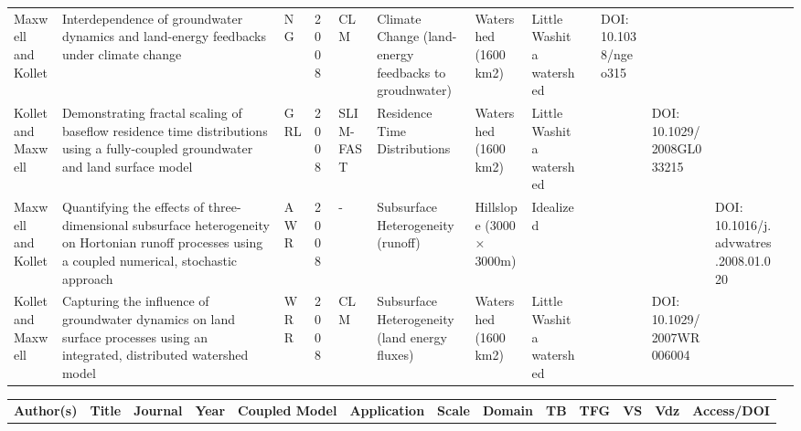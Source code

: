 {\begin{tabular}{ p{1cm} p{2cm} p{0.75cm} p{0.5cm} p{1cm} p{1.5cm} p{1cm} p{1cm} p{0.25cm} p{0.25cm} p{0.25cm} p{0.25cm} p{1cm} }
Maxwell and Kollet & Interdependence of groundwater dynamics and land-energy feedbacks under climate change & NG & 2008 & CLM & Climate Change (land-energy feedbacks to groudnwater) & Watershed (1600 km2) & Little Washita watershed &  & DOI: 10.1038/ngeo315 \\
Kollet and Maxwell & Demonstrating fractal scaling of baseflow residence time distributions using a fully-coupled groundwater and land surface model & GRL & 2008 & SLIM-FAST & Residence Time Distributions  & Watershed (1600 km2) & Little Washita watershed &  &  & DOI: 10.1029/2008GL033215  \\
Maxwell and Kollet & Quantifying the effects of three-dimensional subsurface heterogeneity on Hortonian runoff processes using a coupled numerical, stochastic approach & AWR & 2008 & - & Subsurface Heterogeneity (runoff) & Hillslope (3000  × 3000m) & Idealized &  &  &  & DOI: 10.1016/j.advwatres.2008.01.020 \\
Kollet and Maxwell & Capturing the influence of groundwater dynamics on land surface processes using an integrated, distributed watershed model & WRR & 2008 & CLM & Subsurface Heterogeneity (land energy fluxes) & Watershed (1600 km2) & Little Washita watershed &  &  & DOI: 10.1029/2007WR006004 \\
\end{tabular}

\begin{tabular}{ p{1cm} p{2cm} p{0.75cm} p{0.5cm} p{1cm} p{1.5cm} p{1cm} p{1cm} p{0.25cm} p{0.25cm} p{0.25cm} p{0.25cm} p{1cm} }
\bf{Author(s)} & \bf{Title} & \bf{Journal} & \bf{Year} & \bf{Coupled Model} & \bf{Application} & \bf{Scale} & \bf{Domain} & \bf{TB} & \bf{TFG} & \bf{VS} & \bf{Vdz} & \bf{Access/DOI} \\   


\end{tabular}}
